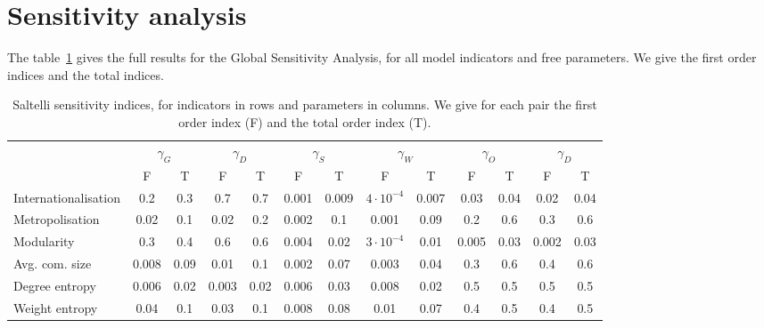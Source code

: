 \section*{Sensitivity analysis}

The table~\ref{tab:saltelli} gives the full results for the Global Sensitivity Analysis, for all model indicators and free parameters. We give the first order indices and the total indices.

\begin{table}[h!]
\begin{adjustwidth}{-2.25in}{0in}
\caption{Saltelli sensitivity indices, for indicators in rows and parameters in columns. We give for each pair the first order index (F) and the total order index (T).\label{tab:saltelli}}
\hspace{-1cm}\begin{tabular}{|l|c|c|c|c|c|c|c|c|c|c|c|c|}
\hline
 & \multicolumn{2}{|c|}{$\gamma_G$} & \multicolumn{2}{|c|}{$\gamma_D$} & \multicolumn{2}{|c|}{$\gamma_S$} & \multicolumn{2}{|c|}{$\gamma_W$} & \multicolumn{2}{|c|}{$\gamma_O$} & \multicolumn{2}{|c|}{$\gamma_D$} \\
 & F & T & F & T & F & T & F & T & F & T & F & T \\
 \hline
Internationalisation & 0.2 & 0.3 & 0.7 & 0.7 & 0.001 & 0.009 & $4\cdot 10^{-4}$ & 0.007 & 0.03 & 0.04 & 0.02 & 0.04 \\
Metropolisation & 0.02 & 0.1 & 0.02 & 0.2 & 0.002 & 0.1 & 0.001 & 0.09 & 0.2 & 0.6 & 0.3 & 0.6 \\
Modularity & 0.3 & 0.4 & 0.6 & 0.6 & 0.004 & 0.02 & $3\cdot 10^{-4}$ & 0.01 & 0.005 & 0.03 & 0.002 & 0.03 \\
Avg. com. size & 0.008 & 0.09 & 0.01 & 0.1 & 0.002 & 0.07 & 0.003 & 0.04 & 0.3 & 0.6 & 0.4 & 0.6 \\
Degree entropy & 0.006 & 0.02 & 0.003 & 0.02 & 0.006 & 0.03 & 0.008 & 0.02 & 0.5 & 0.5 & 0.5 & 0.5 \\
Weight entropy & 0.04 & 0.1 & 0.03 & 0.1 & 0.008 & 0.08 & 0.01 & 0.07 & 0.4 & 0.5 & 0.4 & 0.5 \\\hline
\end{tabular}
\end{adjustwidth}
\end{table}





%